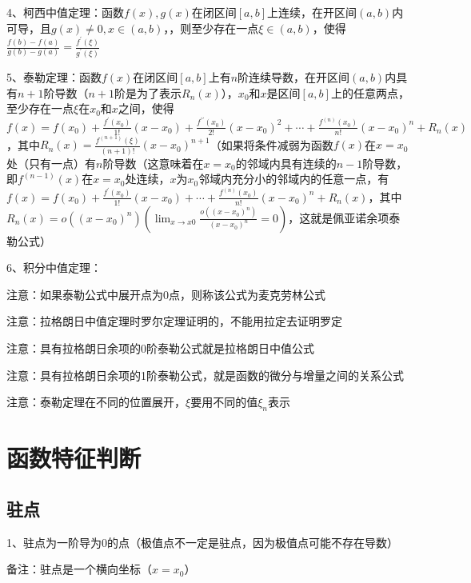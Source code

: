 4、柯西中值定理：函数$f(x),g(x)$在闭区间$[a,b]$上连续，在开区间$(a,b)$内可导，且$g(x)\ne 0,x \in(a, b)$，，则至少存在一点$\xi \in(a, b)$，使得$\frac{f(b)-f(a)}{g(b)-g(a)}=\frac{f^{\prime}(\xi)}{g^{\prime}(\xi)}$

5、泰勒定理：函数$f(x)$在闭区间$[a,b]$上有$n$阶连续导数，在开区间$(a,b)$内具有$n+1$阶导数（$n+1$阶是为了表示$R_{n}(x)$），$x_0$和$x$是区间$[a,b]$上的任意两点，至少存在一点$\xi$在$x_0$和$x$之间，使得$f(x)=f\left(x_{0}\right)+\frac{f^{\prime}\left(x_{0}\right)}{1 !}\left(x-x_{0}\right)+\frac{f^{\prime \prime}\left(x_{0}\right)}{2 !}\left(x-x_{0}\right)^{2}+\cdots+\frac{f^{(n)}\left(x_{0}\right)}{n !}\left(x-x_{0}\right)^{n}+R_{n}(x)$，其中$R_{n}(x)=\frac{f^{(n+1)}(\xi)}{(n+1) !}\left(x-x_{0}\right)^{n+1}$（如果将条件减弱为函数$f(x)$在$x=x_0$处（只有一点）有$n$阶导数（这意味着在$x=x_0$的邻域内具有连续的$n-1$阶导数，即$f^{(n-1)}(x)$在$x=x_0$处连续，$x$为$x_0$邻域内充分小的邻域内的任意一点，有$f(x)=f\left(x_{0}\right)+\frac{f^{\prime}\left(x_{0}\right)}{1 !}\left(x-x_{0}\right)+\cdots+\frac{f^{(n)}\left(x_{0}\right)}{n !}\left(x-x_{0}\right)^{n}+R_{n}(x)$，其中$R_{n}(x)=o\left(\left(x-x_{0}\right)^{n}\right)\left(\lim_ {x \rightarrow x{0}} \frac{o\left(\left(x-x_{0}\right)^{n}\right)}{\left(x-x_{0}\right)^{n}}=0\right)$，这就是佩亚诺余项泰勒公式）

6、积分中值定理：

注意：如果泰勒公式中展开点为0点，则称该公式为麦克劳林公式

注意：拉格朗日中值定理时罗尔定理证明的，不能用拉定去证明罗定

注意：具有拉格朗日余项的0阶泰勒公式就是拉格朗日中值公式

注意：具有拉格朗日余项的1阶泰勒公式，就是函数的微分与增量之间的关系公式

注意：泰勒定理在不同的位置展开，$\xi$要用不同的值$\xi_n$表示

\section{函数特征判断}



\subsection{驻点}

1、驻点为一阶导为0的点（极值点不一定是驻点，因为极值点可能不存在导数）

备注：驻点是一个横向坐标（$x=x_0$）

